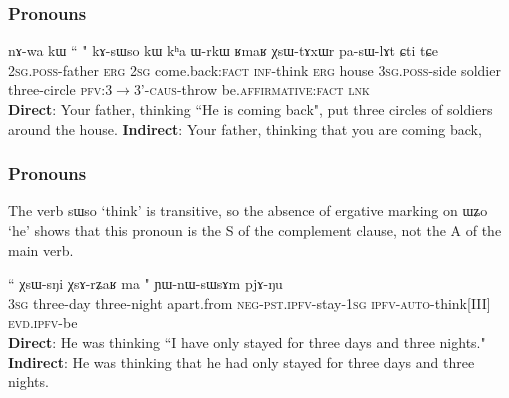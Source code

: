 \documentclass[xcolor=table]{beamer}
\newcommand{\rouge}[1]{{\color{red}#1}}
\newcommand{\bleu}[1]{{\color{blue}#1}}
\newcommand{\ipa}[1]{{\phon #1}} %
\begin{document}
 \begin{frame} 
 

   \begin{exe}
      \frametitle{Pronouns}
\ex \label{ex:nWGi.kAsWso}
\gll 
\ipa{nɤ-wa}  	\ipa{kɯ}  	``\rouge{\ipa{nɤʑo}} 	\bleu{\ipa{nɯɣi}}"  	\ipa{kɤ-sɯso}  	\ipa{kɯ}  	\ipa{kʰa}  	\ipa{ɯ-rkɯ}  	\ipa{ʁmaʁ}  	\ipa{χsɯ-tɤxɯr}  	\ipa{pa-sɯ-lɤt}  	\ipa{ɕti}  	\ipa{tɕe}  \\
\textsc{2sg.poss}-father \textsc{erg} \rouge{\textsc{2sg}} \bleu{come.back:\textsc{fact}}  \textsc{inf}-think \textsc{erg} house \textsc{3sg.poss}-side soldier three-circle \textsc{pfv:3$\rightarrow$3'-caus}-throw be.\textsc{affirmative}:\textsc{fact} \textsc{lnk}\\
\glt \textbf{Direct}: Your father, thinking ``\rouge{He} \bleu{is coming back}",   put three circles of soldiers around the house. 
\glt  \textbf{Indirect}: Your father, thinking that \rouge{you} are coming back,
 \end{exe}
  \end{frame} 
  
        \begin{frame} 
      \frametitle{Pronouns}
      The verb \ipa{sɯso} `think' is transitive, so the absence of ergative marking on \ipa{ɯʑo} `he' shows that this pronoun is the S of the complement clause, not the A of the main verb.
      
\begin{exe}
\ex
\gll  ``\rouge{\ipa{ɯʑo}}  	\ipa{χsɯ-sŋi}  	\ipa{χsɤ-rʑaʁ}  	\ipa{ma}  	\bleu{\ipa{mɯ-pɯ-rɤʑi-a}}"  	\ipa{ɲɯ-nɯ-sɯsɤm}  	\ipa{pjɤ-ŋu}  \\
\rouge{\textsc{3sg}} three-day  three-night apart.from \bleu{\textsc{neg-pst.ipfv}-stay-\textsc{1sg}} \textsc{ipfv-auto}-think[III] \textsc{evd.ipfv}-be \\
\glt    \textbf{Direct}: He was thinking ``\rouge{I} \bleu{have} only \bleu{stayed} for three days and three nights."
\glt    \textbf{Indirect}: He was thinking that \rouge{he} had only stayed for three days and three nights.
  \end{exe}
 \end{frame} 
 
 
 
\end{document}
